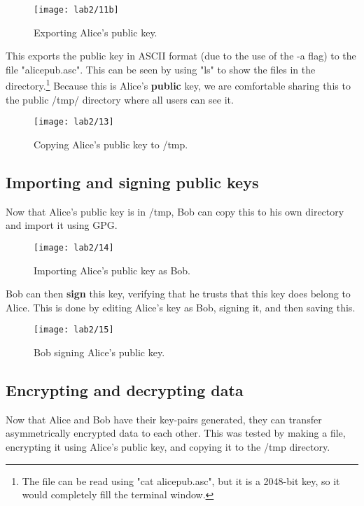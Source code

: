 \begin{figure}[H]
    \centering
    \texttt{[image: lab2/11b]}
    \caption{Exporting Alice's public key.}
    \label{fig:GPGexport}
\end{figure}

\noindent This exports the public key in ASCII format (due to the use of the -a flag) to the file "alicepub.asc".
This can be seen by using "ls" to show the files in the directory.\footnote{The file can be read using "cat alicepub.asc", but it is a 2048-bit key, so it would completely fill the terminal window.}
Because this is Alice's \textbf{public} key, we are comfortable sharing this to the public /tmp/ directory where all
users can see it.

\begin{figure}[H]
    \centering
    \texttt{[image: lab2/13]}
    \caption{Copying Alice's public key to /tmp.}
    \label{fig:alicePubTmp}
\end{figure}


\subsection{Importing and signing public keys}\label{subsec:importing-public-keys}
Now that Alice's public key is in /tmp, Bob can copy this to his own directory and import it using GPG\@.

\begin{figure}[H]
    \centering
    \texttt{[image: lab2/14]}
    \caption{Importing Alice's public key as Bob.}
    \label{fig:importAlice}
\end{figure}

\pagebreak

\noindent Bob can then \textbf{sign} this key, verifying that he trusts that this key does belong to Alice.
This is done by editing Alice's key as Bob, signing it, and then saving this.

\begin{figure}[H]
    \centering
    \texttt{[image: lab2/15]}
    \caption{Bob signing Alice's public key.}
    \label{fig:signAliceKey}
\end{figure}

\pagebreak

\subsection{Encrypting and decrypting data}\label{subsec:encrDecr}
Now that Alice and Bob have their key-pairs generated, they can transfer asymmetrically encrypted data to each other.
This was tested by making a file, encrypting it using Alice's public key, and copying it to the /tmp directory.

